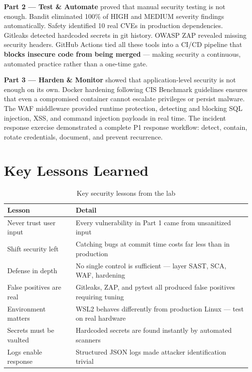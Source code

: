 \documentclass[12pt,a4paper]{report}
\begin{document}
\textbf{Part 2 — Test \& Automate} proved that manual security testing is not enough. Bandit eliminated 100\% of HIGH and MEDIUM severity findings automatically. Safety identified 10 real CVEs in production dependencies. Gitleaks detected hardcoded secrets in git history. OWASP ZAP revealed missing security headers. GitHub Actions tied all these tools into a CI/CD pipeline that \textbf{blocks insecure code from being merged} — making security a continuous, automated practice rather than a one-time gate.

\textbf{Part 3 — Harden \& Monitor} showed that application-level security is not enough on its own. Docker hardening following CIS Benchmark guidelines ensures that even a compromised container cannot escalate privileges or persist malware. The WAF middleware provided runtime protection, detecting and blocking SQL injection, XSS, and command injection payloads in real time. The incident response exercise demonstrated a complete P1 response workflow: detect, contain, rotate credentials, document, and prevent recurrence.

\section{Key Lessons Learned}

\begin{table}[H]
\centering
\begin{tabularx}{\textwidth}{l X}
\toprule
\textbf{Lesson} & \textbf{Detail} \\
\midrule
Never trust user input & Every vulnerability in Part 1 came from unsanitized input \\
Shift security left & Catching bugs at commit time costs far less than in production \\
Defense in depth & No single control is sufficient — layer SAST, SCA, WAF, hardening \\
False positives are real & Gitleaks, ZAP, and pytest all produced false positives requiring tuning \\
Environment matters & WSL2 behaves differently from production Linux — test on real hardware \\
Secrets must be vaulted & Hardcoded secrets are found instantly by automated scanners \\
Logs enable response & Structured JSON logs made attacker identification trivial \\
\bottomrule
\end{tabularx}
\caption{Key security lessons from the lab}
\end{table}
\end{document}
